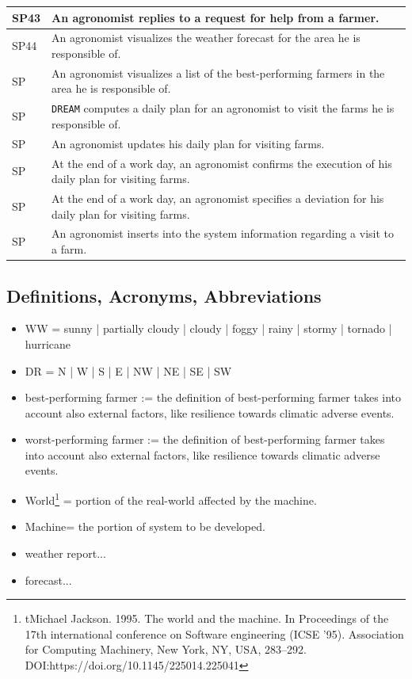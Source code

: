 \documentclass{article}
\begin{document}
\begin{longtable}[c]{|m{0.75cm}|m{11cm}|}
 \hline
 SP43 & An agronomist replies to a request for help from a farmer.\\
 \hline
 SP44 & An agronomist visualizes the weather forecast for the area he is responsible of.\\
 \hline
 SP & An agronomist visualizes a list of the best-performing farmers in the area he is responsible of.\\
 \hline
 SP & \verb|DREAM| computes a daily plan  for an agronomist to visit the farms he is responsible of.\\
 \hline
 SP & An agronomist updates his daily plan for visiting farms.\\
 \hline
 SP & At the end of a work day, an agronomist confirms the execution of his daily plan for visiting farms.\\
 \hline
 SP & At the end of a work day, an agronomist specifies a deviation for his daily plan for visiting farms.\\
 \hline
 SP & An agronomist inserts into the system information regarding a visit to a farm.\\
 \hline
 \end{longtable}

\subsection{Definitions, Acronyms, Abbreviations}\label{Abbreviations}
\begin{itemize}
    \item WW = sunny | partially cloudy |  cloudy | foggy  |  rainy | stormy | tornado | hurricane
    \item DR = N | W | S | E | NW | NE | SE | SW 
    \item best-performing farmer := the definition of best-performing farmer takes into account also external factors, like resilience towards climatic adverse events.
    \item worst-performing farmer := the definition of best-performing farmer takes into account also external factors, like resilience towards climatic adverse events.
    \item World\footnote{{tMichael Jackson. 1995. The world and the machine. In Proceedings of the 17th
international conference on Software engineering (ICSE '95). Association for
Computing Machinery, New York, NY, USA, 283–292.
DOI:https://doi.org/10.1145/225014.225041}} = portion of the real-world
affected by the machine.
\item Machine\footnotemark[10] = the portion of system to be developed.
\item weather report...
\item forecast...
\end{itemize}
\end{document}
